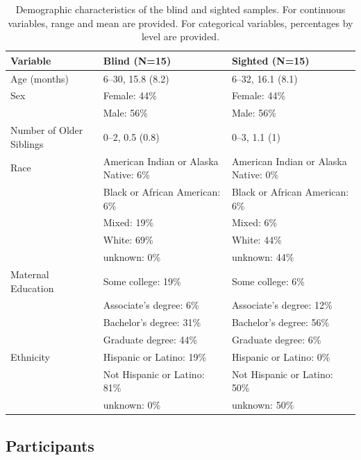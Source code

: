 \documentclass[
  man]{apa6}
\begin{document}
\begin{table}

\caption{\label{tab:participant-characteristics}Demographic characteristics of the blind and sighted samples. For continuous variables, range and mean are provided. For categorical variables, percentages by level are provided.}
\centering
\fontsize{8}{10}\selectfont
\begin{tabular}[t]{l|l|l}
\hline
Variable & Blind (N=15) & Sighted (N=15)\\
\hline
Age (months) & 6--30,
15.8 (8.2) & 6--32,
16.1 (8.1)\\
\hline
Sex & Female: 44\% & Female: 44\%\\
\hline
 & Male: 56\% & Male: 56\%\\
\hline
Number of Older Siblings & 0--2,
0.5 (0.8) & 0--3,
1.1 (1)\\
\hline
Race & American Indian or Alaska Native: 6\% & American Indian or Alaska Native: 0\%\\
\hline
 & Black or African American: 6\% & Black or African American: 6\%\\
\hline
 & Mixed: 19\% & Mixed: 6\%\\
\hline
 & White: 69\% & White: 44\%\\
\hline
 & unknown: 0\% & unknown: 44\%\\
\hline
Maternal Education & Some college: 19\% & Some college: 6\%\\
\hline
 & Associate's degree: 6\% & Associate's degree: 12\%\\
\hline
 & Bachelor's degree: 31\% & Bachelor's degree: 56\%\\
\hline
 & Graduate degree: 44\% & Graduate degree: 6\%\\
\hline
Ethnicity & Hispanic or Latino: 19\% & Hispanic or Latino: 0\%\\
\hline
 & Not Hispanic or Latino: 81\% & Not Hispanic or Latino: 50\%\\
\hline
 & unknown: 0\% & unknown: 50\%\\
\hline
\end{tabular}
\end{table}

\hypertarget{participants}{%
\subsection{Participants}\label{participants}}
\end{document}
